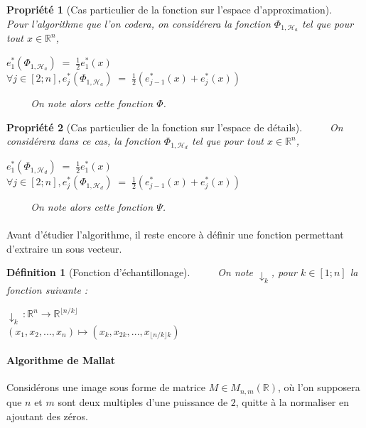 \documentclass[a4paper,10pt]{report}
\theoremstyle{break}
\newtheorem{Def}{D\'{e}finition}
\newtheorem{Prop}{Propri\'{e}t\'{e}}
\begin{document}
    \begin{Prop}[Cas particulier de la fonction sur l'espace d'approximation]
	$\phantom{Prop}$ Pour l'algorithme que l'on codera, on consid\'{e}rera la fonction $ \Phi_{1,\mathcal{H}_a} $ tel que 
	pour tout $ x \in \mathbb{R}^n $,
	\begin{center}
	  $ e_1^* (\Phi_{1, \mathcal{H}_a}) \; = \; \frac{1}{2} e_1^* (x) $ \\
	  $ \forall j \in [2;n], e_j^* (\Phi_{1, \mathcal{H}_a}) \; = \; \frac{1}{2}(e_{j - 1}^* (x) + e_j^* (x))$
	\end{center}
	$\phantom{Prop}$ On note alors cette fonction $\varPhi$.
    \end{Prop}

    \begin{Prop}[Cas particulier de la fonction sur l'espace de d\'{e}tails]
	$\phantom{Prop}$ On consid\'{e}rera dans ce cas, la fonction $ \Phi_{1,\mathcal{H}_d} $ tel que 
	pour tout $ x \in \mathbb{R}^n $,
	\begin{center}
	  $ e_1^* (\Phi_{1, \mathcal{H}_d}) \; = \; \frac{1}{2} e_1^* (x) $ \\
	  $ \forall j \in [2;n], e_j^* (\Phi_{1, \mathcal{H}_d}) \; = \; \frac{1}{2}(e_{j - 1}^* (x) + e_j^* (x))$
	\end{center}
	$\phantom{Prop}$ On note alors cette fonction $\varPsi$.
    \end{Prop}
	
    \paragraph{} Avant d'\'{e}tudier l'algorithme, il reste encore \`{a} d\'{e}finir une fonction permettant d'extraire un sous vecteur.
    
    \begin{Def}[Fonction d'\'{e}chantillonage]
	$\phantom{Prop}$ On note $\downarrow_k $, pour $k \in [1;n]$ la fonction suivante :
	\begin{center}
	  $ \downarrow_k \, : \mathbb{R}^n \longrightarrow \mathbb{R}^{\lfloor n / k \rfloor} $ \\
	  $ (x_1, x_2, ..., x_n) \longmapsto (x_k, x_{2 k}, ..., x_{\lfloor n / k \rfloor k}) $
	\end{center}
    \end{Def}

    \paragraph{Algorithme de Mallat} Consid\'{e}rons une image sous forme de matrice $M \in M_{n,m}(\mathbb{R})$, o\`{u} l'on supposera
	que $n$ et $m$ sont deux multiples d'une puissance de $2$, quitte \`{a} la normaliser en ajoutant des z\'{e}ros. \newline
	
\end{document}
